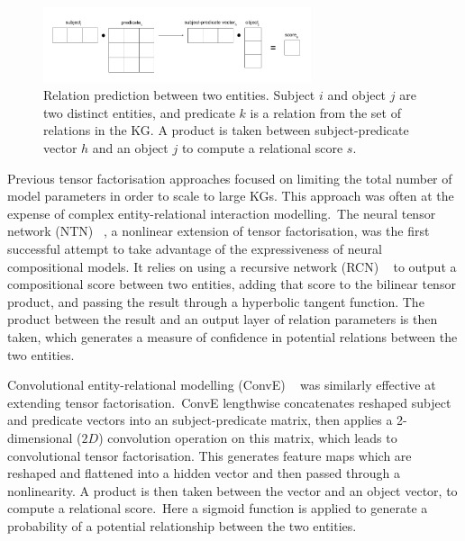 \begin{figure}[H]
   	\centering
    	\includegraphics[width=0.7\textwidth, height=0.2\textwidth]{inference}
	\captionsetup{justification=centering}
	\caption{Relation prediction between two entities. Subject $ i $ and object $ j $ are two distinct entities, and predicate $ k $ is a relation from the set of relations in the KG. A product is taken between subject-predicate vector $ h $ and an object $ j $ to compute a relational score $ s $.}
\end{figure}

\noindent Previous tensor factorisation approaches focused on limiting the total number of model parameters in order to scale to large KGs. This approach was often at the expense of complex entity-relational interaction modelling.\ The neural tensor network (NTN) \unskip~\citep{socher2013reasoning}, a nonlinear extension of tensor factorisation, was the first successful attempt to take advantage of the expressiveness of neural compositional models. It relies on using a recursive network (RCN) \unskip ~\citep{pollack1990recursive} to output a compositional score between two entities, adding that score to the bilinear tensor product, and passing the result through a hyperbolic tangent function. The product between the result and an output layer of relation parameters is then taken, which generates a measure of confidence in potential relations between the two entities.\par

\noindent Convolutional entity-relational modelling (ConvE) \unskip~\citep{dettmers2018convolutional} was similarly effective at extending tensor factorisation.\ ConvE lengthwise concatenates reshaped subject and predicate vectors into an subject-predicate matrix, then applies a 2-dimensional ($ 2D $) convolution operation on this matrix, which leads to convolutional tensor factorisation. This generates feature maps which are reshaped and flattened into a hidden vector and then passed through a nonlinearity. A product is then taken between the vector and an object vector, to compute a relational score.\ Here a sigmoid function is applied to generate a probability of a potential relationship between the two entities. \par 

